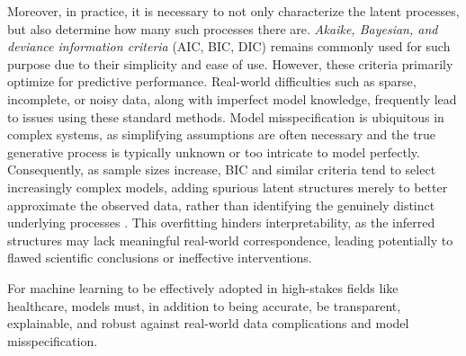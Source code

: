 Moreover, in practice, it is necessary to not only characterize
the latent processes, but also determine how many such processes there are. \emph{Akaike, Bayesian, and deviance information criteria} (AIC, BIC, DIC) \citep{Akaike:1974,Schwarz:1978,Spiegelhalter:2002} remains commonly used for such purpose due to their simplicity and ease of use. However, these criteria primarily optimize for predictive performance.
Real-world difficulties such as sparse, incomplete, or noisy data, along with imperfect model knowledge, 
frequently lead to issues using these standard methods. 
Model misspecification is ubiquitous in complex systems, as simplifying assumptions are often necessary 
and the true generative process is typically unknown or too intricate to model perfectly. 
Consequently, as sample sizes increase, BIC and similar criteria tend to select increasingly complex models, 
adding spurious latent structures merely to better approximate the observed data, 
rather than identifying the genuinely distinct underlying processes \citep{Cai:2021}. This overfitting hinders interpretability, 
as the inferred structures may lack meaningful real-world correspondence, 
leading potentially to flawed scientific conclusions or ineffective interventions.

For machine learning to be effectively adopted in high-stakes fields like healthcare, models must, in addition to being accurate, be transparent, explainable, and robust against real-world data complications and model misspecification.

